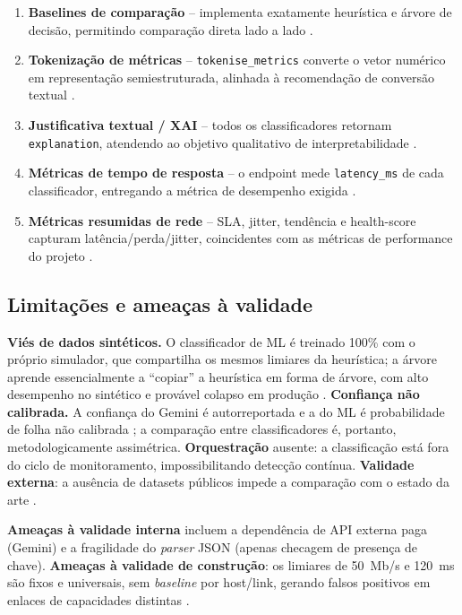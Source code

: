 \documentclass[12pt,a4paper]{article}
\begin{document}
\begin{enumerate}
  \item \textbf{Baselines de comparação} -- implementa exatamente heurística e
  árvore de decisão, permitindo comparação direta lado a lado \cite{rA210}\cite{rA217}.
  \item \textbf{Tokenização de métricas} -- \texttt{tokenise\_metrics} converte
  o vetor numérico em representação semiestruturada, alinhada à recomendação de
  conversão textual \cite{rA616}\cite{rA431}.
  \item \textbf{Justificativa textual / XAI} -- todos os classificadores retornam
  \texttt{explanation}, atendendo ao objetivo qualitativo de interpretabilidade
  \cite{rA511}\cite{rA537}.
  \item \textbf{Métricas de tempo de resposta} -- o endpoint mede
  \texttt{latency\_ms} de cada classificador, entregando a métrica de desempenho
  exigida \cite{rA31}.
  \item \textbf{Métricas resumidas de rede} -- SLA, jitter, tendência e
  health-score capturam latência/perda/jitter, coincidentes com as métricas de
  performance do projeto \cite{rA19}.
\end{enumerate}

\subsection{Limitações e ameaças à validade}
\label{sec:ameacas}

\textbf{Viés de dados sintéticos.} O classificador de ML é treinado 100\% com o
próprio simulador, que compartilha os mesmos limiares da heurística; a árvore
aprende essencialmente a ``copiar'' a heurística em forma de árvore, com alto
desempenho no sintético e provável colapso em produção \cite{rA414}\cite{rA615}.
\textbf{Confiança não calibrada.} A confiança do Gemini é autorreportada e a do
ML é probabilidade de folha não calibrada \cite{rA532}; a comparação entre
classificadores é, portanto, metodologicamente assimétrica. \textbf{
Orquestração} ausente: a classificação está fora do ciclo de monitoramento,
impossibilitando detecção contínua. \textbf{Validade externa}: a ausência de
datasets públicos impede a comparação com o estado da arte \cite{rA65}\cite{rA630}.

\textbf{Ameaças à validade interna} incluem a dependência de API externa paga
(Gemini) e a fragilidade do \textit{parser} JSON (apenas checagem de presença
de chave). \textbf{Ameaças à validade de construção}: os limiares de 50~Mb/s e
120~ms são fixos e universais, sem \textit{baseline} por host/link, gerando
falsos positivos em enlaces de capacidades distintas \cite{rA21}.
\end{document}
